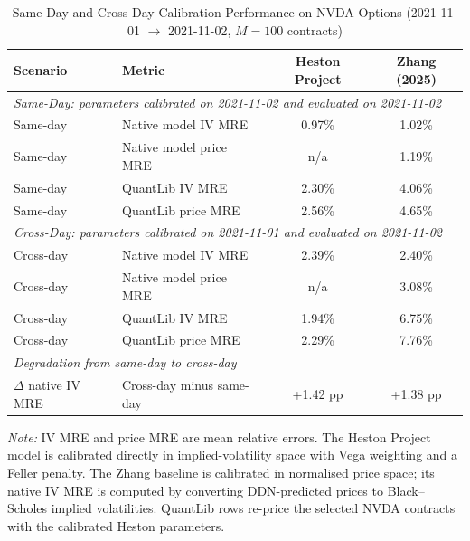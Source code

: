 \begin{table}[htbp]
  \centering
  \caption{Same-Day and Cross-Day Calibration Performance on NVDA Options (2021-11-01 $\rightarrow$ 2021-11-02, $M=100$ contracts)}
  \label{tab:nvda_calibration}
  \setlength{\tabcolsep}{6pt}
  \begin{tabular}{llcc}
    \toprule
    \textbf{Scenario} & \textbf{Metric} & \textbf{Heston Project} & \textbf{Zhang (2025)} \\
    \midrule
    \multicolumn{4}{l}{\textit{Same-Day: parameters calibrated on 2021-11-02 and evaluated on 2021-11-02}} \\
    \quad Same-day & Native model IV MRE & 0.97\% & 1.02\% \\
    \quad Same-day & Native model price MRE & n/a & 1.19\% \\
    \quad Same-day & QuantLib IV MRE & 2.30\% & 4.06\% \\
    \quad Same-day & QuantLib price MRE & 2.56\% & 4.65\% \\
    \midrule
    \multicolumn{4}{l}{\textit{Cross-Day: parameters calibrated on 2021-11-01 and evaluated on 2021-11-02}} \\
    \quad Cross-day & Native model IV MRE & 2.39\% & 2.40\% \\
    \quad Cross-day & Native model price MRE & n/a & 3.08\% \\
    \quad Cross-day & QuantLib IV MRE & 1.94\% & 6.75\% \\
    \quad Cross-day & QuantLib price MRE & 2.29\% & 7.76\% \\
    \midrule
    \multicolumn{4}{l}{\textit{Degradation from same-day to cross-day}} \\
    \quad $\Delta$ native IV MRE & Cross-day minus same-day & +1.42 pp & +1.38 pp \\
    \bottomrule
  \end{tabular}
  \begin{tablenotes}
    \small
    \item \textit{Note:} IV MRE and price MRE are mean relative errors. The Heston Project model is calibrated directly in implied-volatility space with Vega weighting and a Feller penalty. The Zhang baseline is calibrated in normalised price space; its native IV MRE is computed by converting DDN-predicted prices to Black--Scholes implied volatilities. QuantLib rows re-price the selected NVDA contracts with the calibrated Heston parameters.
  \end{tablenotes}
\end{table}
